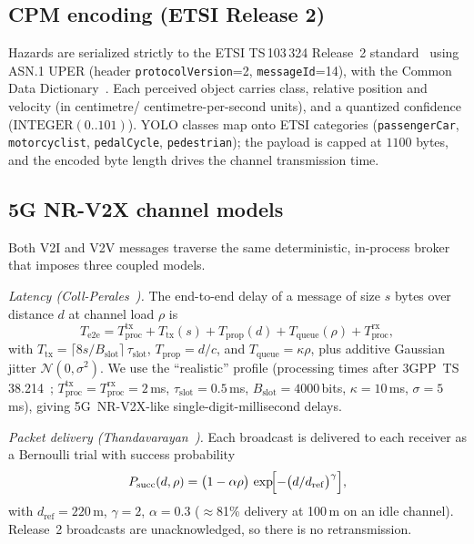 \documentclass[11pt]{article}
\begin{document}
\subsection{CPM encoding (ETSI Release 2)}
Hazards are serialized strictly to the ETSI \mbox{TS\,103\,324} Release~2
standard~\cite{etsicpm2023} using ASN.1 \mbox{UPER} (header
\texttt{protocolVersion}=2,
\texttt{messageId}=14), with the Common Data Dictionary~\cite{etsicdd}. Each
perceived object carries class, relative position and velocity (in centimetre/%
centimetre-per-second units), and a quantized confidence
($\mathrm{INTEGER}(0..101)$). YOLO classes map onto ETSI categories
(\texttt{passengerCar}, \texttt{motorcyclist}, \texttt{pedalCycle},
\texttt{pedestrian}); the payload is capped at $1100$ bytes, and the encoded byte
length drives the channel transmission time.

\subsection{5G NR-V2X channel models}
Both V2I and V2V messages traverse the same deterministic, in-process broker that
imposes three coupled models.

\noindent\emph{Latency (Coll-Perales~\cite{collperales2022}).} The end-to-end
delay of a message of size $s$ bytes over distance $d$ at channel load $\rho$ is
\begin{equation}
T_{\mathrm{e2e}} = T_{\mathrm{proc}}^{\mathrm{tx}} + T_{\mathrm{tx}}(s)
   + T_{\mathrm{prop}}(d) + T_{\mathrm{queue}}(\rho) + T_{\mathrm{proc}}^{\mathrm{rx}},
\end{equation}
with $T_{\mathrm{tx}}=\lceil 8s/B_{\mathrm{slot}}\rceil\,\tau_{\mathrm{slot}}$,
$T_{\mathrm{prop}}=d/c$, and $T_{\mathrm{queue}}=\kappa\rho$, plus additive
Gaussian jitter $\mathcal{N}(0,\sigma^2)$. We use the ``realistic'' profile
(processing times after 3GPP~TS\,38.214~\cite{tgpp38214};
$T_{\mathrm{proc}}^{\mathrm{tx}}=T_{\mathrm{proc}}^{\mathrm{rx}}=2$\,ms,
$\tau_{\mathrm{slot}}=0.5$\,ms, $B_{\mathrm{slot}}=4000$\,bits,
$\kappa=10$\,ms, $\sigma=5$\,ms), giving 5G~NR-V2X-like single-digit-millisecond
delays.

\noindent\emph{Packet delivery (Thandavarayan~\cite{thandavarayan2020}).} Each
broadcast is delivered to each receiver as a Bernoulli trial with success
probability
\begin{equation}
P_{\mathrm{succ}}(d,\rho) = \bigl(1-\alpha\rho\bigr)\,
   \exp\!\Bigl[-\bigl(d/d_{\mathrm{ref}}\bigr)^{\gamma}\Bigr],
\end{equation}
with $d_{\mathrm{ref}}=220$\,m, $\gamma=2$, $\alpha=0.3$
($\approx$81\% delivery at 100\,m on an idle channel). Release~2 broadcasts are
unacknowledged, so there is no retransmission.
\end{document}
